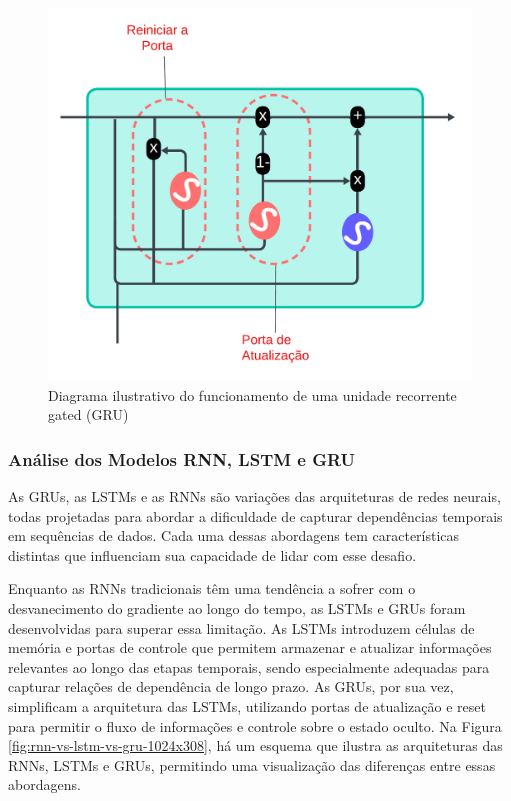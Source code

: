\begin{figure}[H]
	\centering
	\caption{Diagrama ilustrativo do funcionamento de uma unidade recorrente gated (GRU)}
	\label{fig:gru}
	\includegraphics[width=0.5\linewidth]{Apendices/Figuras/modelagem-24h/gru}
	
\end{figure}



\subsubsection{An\'alise dos Modelos RNN, LSTM e GRU}

As GRUs, as LSTMs e as RNNs são variações das arquiteturas de redes neurais, todas projetadas para abordar a dificuldade de capturar dependências temporais em sequências de dados. Cada uma dessas abordagens tem características distintas que influenciam sua capacidade de lidar com esse desafio.

Enquanto as RNNs tradicionais têm uma tendência a sofrer com o desvanecimento do gradiente ao longo do tempo, as LSTMs e GRUs foram desenvolvidas para superar essa limitação. As LSTMs introduzem células de memória e portas de controle que permitem armazenar e atualizar informações relevantes ao longo das etapas temporais, sendo especialmente adequadas para capturar relações de dependência de longo prazo. As GRUs, por sua vez, simplificam a arquitetura das LSTMs, utilizando portas de atualização e reset para permitir o fluxo de informações e controle sobre o estado oculto.
Na Figura \ref{fig:rnn-vs-lstm-vs-gru-1024x308}, há um esquema que ilustra as arquiteturas das RNNs, LSTMs e GRUs, permitindo uma visualização das diferenças entre essas abordagens.

